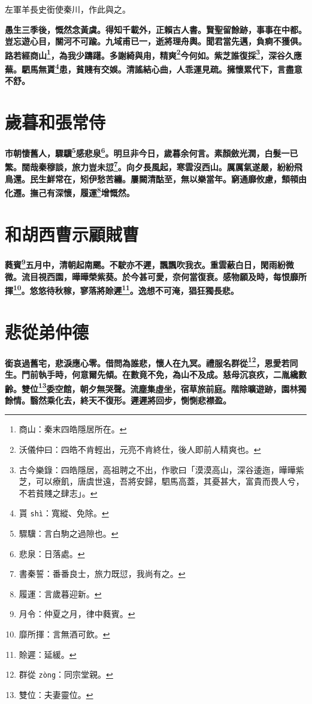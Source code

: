 \begin{quoting}左軍羊長史銜使秦川，作此與之。\end{quoting}

\textbf{愚生三季後，慨然念黃虞。得知千載外，正賴古人書。賢聖留餘跡，事事在中都。豈忘遊心目，關河不可踰。九域甫已一，逝將理舟輿。聞君當先邁，負痾不獲俱。路若經商山\footnote{商山：秦末四皓隱居所在。}，為我少躊躇。多謝綺與甪，精爽\footnote{沃儀仲曰：四皓不肯輕出，元亮不肯終仕，後人即前人精爽也。}今何如。紫芝誰復採\footnote{古今樂錄：四皓隱居，高祖聘之不出，作歌曰「漠漠高山，深谷逶迤，曄曄紫芝，可以療飢，唐虞世遠，吾將安歸，駟馬高蓋，其憂甚大，富貴而畏人兮，不若貧賤之肆志」。}，深谷久應蕪。駟馬無貰\footnote{貰 \texttt{shì}：寬縱、免除。}患，貧賤有交娛。清謠結心曲，人乖運見疏。擁懷累代下，言盡意不舒。}

\section{歲暮和張常侍}

\textbf{市朝悽舊人，驟驥\footnote{驟驥：言白駒之過隙也。}感悲泉\footnote{悲泉：日落處。}。明旦非今日，歲暮余何言。素顏斂光潤，白髮一已繁。闊哉秦穆談，旅力豈未愆\footnote{書秦誓：番番良士，旅力既愆，我尚有之。}。向夕長風起，寒雲沒西山。厲厲氣遂嚴，紛紛飛鳥還。民生鮮常在，矧伊愁苦纏。屢闕清酤至，無以樂當年。窮通靡攸慮，顦顇由化遷。撫己有深懷，履運\footnote{履運：言歲暮迎新。}增慨然。}

\section{和胡西曹示顧賊曹}

\textbf{蕤賓\footnote{月令：仲夏之月，律中蕤賓。}五月中，清朝起南颸。不駛亦不遲，飄飄吹我衣。重雲蔽白日，閑雨紛微微。流目視西園，曄曄榮紫葵。於今甚可愛，奈何當復衰。感物願及時，每恨靡所揮\footnote{靡所揮：言無酒可飲。}。悠悠待秋稼，寥落將賒遲\footnote{賒遲：延緩。}。逸想不可淹，猖狂獨長悲。}

\section{悲從弟仲德}

\textbf{銜哀過舊宅，悲淚應心零。借問為誰悲，懷人在九冥。禮服名群從\footnote{群從 \texttt{zòng}：同宗堂親。}，恩愛若同生。門前執手時，何意爾先傾。在數竟不免，為山不及成。慈母沉哀疚，二胤纔數齡。雙位\footnote{雙位：夫妻靈位。}委空館，朝夕無哭聲。流塵集虛坐，宿草旅前庭。階除曠遊跡，園林獨餘情。翳然乘化去，終天不復形。遲遲將回步，惻惻悲襟盈。}

